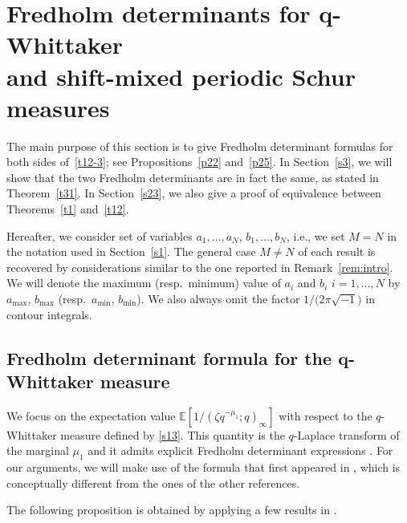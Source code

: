 \documentclass[11pt]{article}
\numberwithin{equation}{section}
\numberwithin{equation}{section}
\newcommand{\E}[1]{\widetilde{e}_{#1}}
\def\E{\mathbb{E}}
\def\i{\infty}
\begin{document}
\setcounter{section}{1}
\section[Fredholm determinants for q-Whittaker and shift-mixed periodic Schur measures]{Fredholm determinants for $\boldsymbol{q}$-Whittaker\\ and shift-mixed periodic Schur measures}
\label{s2}

The main purpose of this section is to give Fredholm determinant formulas for both sides of~\eqref{t12-3}; see Propositions~\ref{p22} and~\ref{p25}.
In Section~\ref{s3}, we will show that the two Fredholm determinants are in fact the same,
as stated in Theorem~\ref{t31}. In Section~\ref{s23}, we also give a proof of equivalence between Theorems~\ref{t1} and~\ref{t12}.

Hereafter, we consider set of variables $a_1,\dots,a_N$, $b_1,\dots,b_N$, i.e., we set $M=N$ in the notation used in Section~\ref{s1}. The general case $M \neq N$ of each result is recovered by considerations similar to the one reported in Remark~\ref{rem:intro}. We will denote the maximum (resp.\ minimum) value of $a_i$ and $b_i$ $i=1,\dots,N$ by $a_{\max}$, $b_{\max}$ (resp.\ $a_{\min}$, $b_{\min}$). We also always omit the factor $1/\big(2\pi \sqrt{-1}\big)$ in contour integrals.

\subsection[Fredholm determinant formula for the q-Whittaker measure]{Fredholm determinant formula for the $\boldsymbol{q}$-Whittaker measure}
\label{s21}

We focus on the expectation value $\E[1/(\zeta q^{-\mu_1};q)_{\i}]$ with respect to the $q$-Whittaker measure defined by \eqref{s13}. This quantity is the $q$-Laplace transform of the marginal $\mu_1$ and it admits explicit Fredholm determinant expressions \cite{BorodinCorwin2014Mac,BoCoFeVe2015,BufetovMucciconiPetrov2019,ImamuraSasamoto2019qTASEPtheta,MatveevPetrov2015}. For our arguments, we will make use of the formula that first appeared in \cite{ImamuraSasamoto2019qTASEPtheta}, which is conceptually different from the ones of the other references.

The following proposition is obtained by applying a few results
in \cite{ImamuraSasamoto2019qTASEPtheta}.
\end{document}
